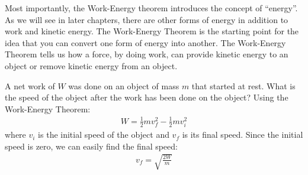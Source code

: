 Most importantly, the Work-Energy theorem introduces the concept of ``energy''. As we will see in later chapters, there are other forms of energy in addition to work and kinetic energy. The Work-Energy Theorem is the starting point for the idea that you can convert one form of energy into another. The Work-Energy Theorem tells us how a force, by doing work, can provide kinetic energy to an object or remove kinetic energy from an object.  

\begin{example}{A net work of $W$ was done on an object of mass $m$ that started at rest. What is the speed of the object after the work has been done on the object?}
Using the Work-Energy Theorem:
\begin{align*}
W = \frac{1}{2}mv_f^2 - \frac{1}{2}mv_i^2
\end{align*}
where $v_i$ is the initial speed of the object and $v_f$ is its final speed. Since the initial speed is zero, we can easily find the final speed:
\begin{align*}
v_f = \sqrt{\frac{2W}{m}}
\end{align*}
\end{example}
\vspace{-0.25cm}
